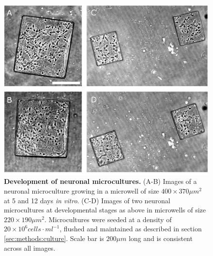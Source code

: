         \begin{figure}[h]
            \centering
            \includegraphics[width=13.7cm]{chapter4/figures/microWellsDev/microwellsDev.jpg}
            \caption[Development of neuronal microcultures]{\textbf{Development of neuronal microcultures.} (A-B) Images of a neuronal microculture growing in a microwell of size \(400\times370 \mu m^2\) at 5 and 12 days \textit{in vitro}. (C-D) Images of two neuronal microcultures at developmental stages as above in microwells of size \(220\times190 \mu m^2\). Microcultures were seeded at a density of \(20\times10^6 cells\cdot ml^{-1}\), flushed and maintained as described in section \ref{sec:methods:culture}. Scale bar is \(200 \mu m\) long and is consistent across all images.}
            \label{fig:devices:mwDev}
        \end{figure}

